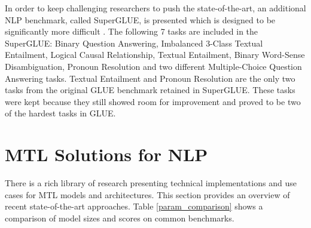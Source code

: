 \documentclass[twocolumn]{article}
\begin{document}
In order to keep challenging researchers to push the state-of-the-art, an additional NLP benchmark, called SuperGLUE, is presented which is designed to be significantly more difficult \citep{superglue19}. The following 7 tasks are included in the SuperGLUE: Binary Question Answering, Imbalanced 3-Class Textual Entailment, Logical Causal Relationship, Textual Entailment, Binary Word-Sense Disambiguation, Pronoun Resolution and two different Multiple-Choice Question Answering tasks. Textual Entailment and Pronoun Resolution are the only two tasks from the original GLUE benchmark retained in SuperGLUE. These tasks were kept because they still showed room for improvement and proved to be two of the hardest tasks in GLUE.

\section{MTL Solutions for NLP}
There is a rich library of research presenting technical implementations and use cases for MTL models and architectures. This section provides an overview of recent state-of-the-art approaches. Table \ref{param_comparison} shows a comparison of model sizes and scores on common benchmarks.

\begin{table}[t]
	\caption{MTL Model Comparison}\smallskip
	\centering
	\label{param_comparison}
\end{table}
\end{document}
